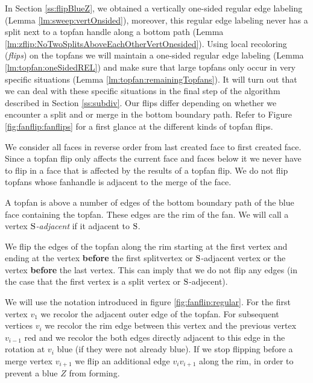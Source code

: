 In Section \ref{ss:flipBlueZ}, we obtained a vertically one-sided regular edge labeling (Lemma \ref{lm:sweep:vertOnsided}), moreover, this regular edge labeling never has a split next to a topfan handle along a bottom path (Lemma \ref{lm:zflip:NoTwoSplitsAboveEachOtherVertOnesided}).
Using local recoloring (\emph{flips}) on the topfans we will maintain a one-sided regular edge labeling (Lemma \ref{lm:topfan:oneSidedREL}) and make sure that large topfans only occur in very specific situations (Lemma \ref{lm:topfan:remainingTopfans}). It will turn out that we can deal with these specific situations in the final step of the algorithm described in Section \ref{ss:subdiv}.
Our flips differ depending on whether we encounter a split and or merge in the bottom boundary path.
Refer to Figure \ref{fig:fanflip:fanflips} for a first glance at the different kinds of topfan flips.


  We consider all faces in reverse order from last created face to first created face. Since a topfan flip only affects the current face and faces below it we never have to flip in a face that is affected by the results of a topfan flip.
  We do not flip topfans whose fanhandle is adjacent to the merge of the face. %

  A topfan is above a number of edges of the bottom boundary path of the blue face containing the topfan. These edges are the rim of the fan. We will call a vertex \emph{$\mathrm{S}$-adjacent} if it adjacent to $\mathrm{S}$.

  We flip the edges of the topfan along the rim starting at the first vertex and ending at the vertex \textbf{before} the first splitvertex or $\mathrm{S}$-adjacent vertex or the vertex \textbf{before} the last vertex. This can imply that we do not flip any edges (in the case that the first vertex is a split vertex or $\mathrm{S}$-adjecent).

  We will use the notation introduced in figure \ref{fig:fanflip:regular}.
  For the first vertex $v_1$ we recolor the adjacent outer edge of the topfan. For subsequent vertices $v_i$ we recolor the rim edge between this vertex and the previous vertex $v_{i-1}$ red and we recolor the both edges directly adjacent to this edge in the rotation at $v_i$ blue (if they were not already blue).
  If we stop flipping before a merge vertex $v_{i+1}$ we flip an additional edge $v_i v_{i+1}$ along the rim, in order to prevent a blue $Z$ from forming.


